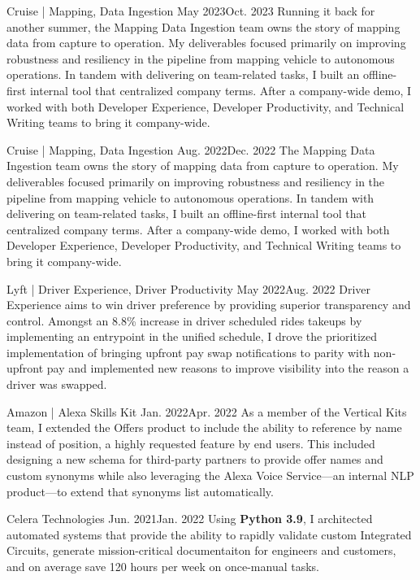 \documentclass{listofpersonalprofessionalachievements}
\begin{document}
\begin{itemize}
    {Cruise | Mapping, Data Ingestion}
    {May 2023}{Oct. 2023}
    {Running it back for another summer, the Mapping Data Ingestion team owns the story of mapping data from capture to operation. My deliverables focused primarily on improving robustness and resiliency in the pipeline from mapping vehicle to autonomous operations. In tandem with delivering on team-related tasks, I built an offline-first internal tool that centralized company terms. After a company-wide demo, I worked with both Developer Experience, Developer Productivity, and Technical Writing teams to bring it company-wide.}

    {Cruise | Mapping, Data Ingestion}
    {Aug. 2022}{Dec. 2022}
    {The Mapping Data Ingestion team owns the story of mapping data from capture to operation. My deliverables focused primarily on improving robustness and resiliency in the pipeline from mapping vehicle to autonomous operations. In tandem with delivering on team-related tasks, I built an offline-first internal tool that centralized company terms. After a company-wide demo, I worked with both Developer Experience, Developer Productivity, and Technical Writing teams to bring it company-wide.}

    {Lyft | Driver Experience, Driver Productivity}
    {May 2022}{Aug. 2022}
    {Driver Experience aims to win driver preference by providing superior transparency and control. Amongst an 8.8\% increase in driver scheduled rides takeups by implementing an entrypoint in the unified schedule, I drove the prioritized implementation of bringing upfront pay swap notifications to parity with non-upfront pay and implemented new reasons to improve visibility into the reason a driver was swapped.}

    {Amazon | Alexa Skills Kit}
    {Jan. 2022}{Apr. 2022}
    {As a member of the Vertical Kits team, I extended the Offers product to include the ability to reference by name instead of position, a highly requested feature by end users. This included designing a new schema for third-party partners to provide offer names and custom synonyms while also leveraging the Alexa Voice Service—an internal NLP product—to extend that synonyms list automatically.}

    {Celera Technologies}
    {Jun. 2021}{Jan. 2022}
    {Using \textbf{Python 3.9}, I architected automated systems that provide the ability to rapidly validate custom Integrated Circuits, generate mission-critical documentaiton for engineers and customers, and on average save 120 hours per week on once-manual tasks.}
\end{itemize}
\end{document}
